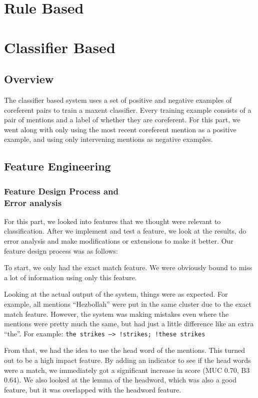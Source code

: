 \documentclass[12pt, twocolumn]{article}
\begin{document}
\section{Rule Based}

\section{Classifier Based}
\subsection{Overview}
The classifier based system uses a set of positive and negative examples of coreferent pairs to train a maxent classifier. Every training example consists of a pair of mentions and a label of whether they are coreferent. For this part, we went along with only using the most recent coreferent mention as a positive example, and using only intervening mentions as negative examples. 
\subsection{Feature Engineering}
\subsubsection{Feature Design Process and\\ Error analysis}
For this part, we looked into features that we thought were relevant to classification. After we implement and test a feature, we look at the results, do error analysis and make modifications or extensions to make it better. Our feature design process was as follows:

To start, we only had the exact match feature. We were obviously bound to miss a lot of information using only this feature. 

Looking at the actual output of the system, things were as expected. For example, all mentions ``Hezbollah'' were put in the same cluster due to the exact match feature. However, the system was making mistakes even where the mentions were pretty much the same, but had just a little difference like an extra ``the''. For example: \texttt{{the strikes} -->  !{strikes}; !{these strikes}}

From that, we had the idea to use the head word of the mentions. This turned out to be a high impact feature. By adding an indicator to see if the head words were a match, we immediately got a significant increase in score (MUC 0.70, B3 0.64). We also looked at the lemma of the headword, which was also a good feature, but it was overlapped with the headword feature.
\end{document}
